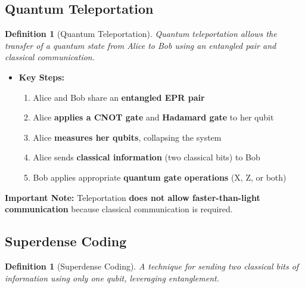 \documentclass{article}
\newtheorem{definition}[theorem]{Definition}
\begin{document}
\subsection{Quantum Teleportation}
\begin{definition}[Quantum Teleportation]
Quantum teleportation allows the transfer of a quantum state from Alice to Bob using an entangled pair and classical communication.
\end{definition}

\begin{itemize}
    \item \textbf{Key Steps:}
    \begin{enumerate}
        \item Alice and Bob share an \textbf{entangled EPR pair}
        \item Alice \textbf{applies a CNOT gate} and \textbf{Hadamard gate} to her qubit
        \item Alice \textbf{measures her qubits}, collapsing the system
        \item Alice sends \textbf{classical information} (two classical bits) to Bob
        \item Bob applies appropriate \textbf{quantum gate operations} (X, Z, or both)
    \end{enumerate}
\end{itemize}

\begin{conceptbox}
\textbf{Important Note:} Teleportation \textbf{does not allow faster-than-light communication} because classical communication is required.
\end{conceptbox}

\subsection{Superdense Coding}
\begin{definition}[Superdense Coding]
A technique for sending two classical bits of information using only one qubit, leveraging entanglement.
\end{definition}
\end{document}
